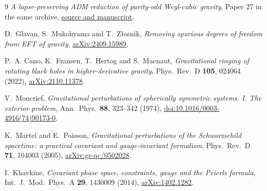 \documentclass[11pt]{article}
\begin{document}
\begin{thebibliography}{9}
\emph{A lapse-preserving ADM reduction of parity-odd Weyl-cubic gravity},
Paper 27 in the same archive,
\href{https://github.com/g3173028019-beep/ai-automated-quantum-gravity-research/tree/main/papers/27-parity-odd-weyl-cubic-adm}{source and manuscript}.

D.~Glavan, S.~Mukohyama and T.~Z{\l}osnik,
\emph{Removing spurious degrees of freedom from EFT of gravity},
\href{https://arxiv.org/abs/2409.15989}{arXiv:2409.15989}.

P.~A. Cano, K.~Fransen, T.~Hertog and S.~Maenaut,
\emph{Gravitational ringing of rotating black holes in higher-derivative gravity},
Phys.\ Rev.\ D \textbf{105}, 024064 (2022),
\href{https://arxiv.org/abs/2110.11378}{arXiv:2110.11378}.

V.~Moncrief,
\emph{Gravitational perturbations of spherically symmetric systems. I. The exterior problem},
Ann.\ Phys.\ \textbf{88}, 323--342 (1974),
\href{https://doi.org/10.1016/0003-4916(74)90173-0}{doi:10.1016/0003-4916(74)90173-0}.

K.~Martel and E.~Poisson,
\emph{Gravitational perturbations of the Schwarzschild spacetime: a practical covariant and gauge-invariant formalism},
Phys.\ Rev.\ D \textbf{71}, 104003 (2005),
\href{https://arxiv.org/abs/gr-qc/0502028}{arXiv:gr-qc/0502028}.

I.~Khavkine, \emph{Covariant phase space, constraints, gauge and the Peierls formula},
Int.\ J.\ Mod.\ Phys.\ A \textbf{29}, 1430009 (2014),
\href{https://arxiv.org/abs/1402.1282}{arXiv:1402.1282}.
\end{thebibliography}
\end{document}
